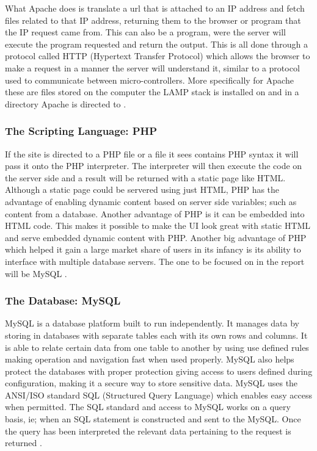 \documentclass[a4paper,11pt]{article}
\numberwithin{figure}{section}
\numberwithin{table}{section}
\begin{document}
What Apache does is translate a url that is attached to an IP address and fetch files related to that IP address, returning them to the browser or program that the IP request came from. This can also be a program, were the server will execute the program requested and return the output. This is all done through a protocol called HTTP (Hypertext Transfer Protocol) which allows the browser to make a request in a manner the server will understand it, similar to a protocol used to communicate between micro-controllers. More specifically for Apache these are files stored on the computer the LAMP stack is installed on and in a directory Apache is directed to \cite{apachebook1,apachebook2}.  


\subsubsection{The Scripting Language: PHP}
If the site is directed to a PHP file or a file it sees contains PHP syntax it will pass it onto the PHP interpreter. The interpreter will then execute the code on the server side and a result will be returned with a static page like HTML. Although a static page could be servered using just HTML, PHP has the advantage of enabling dynamic content based on server side variables; such as content from a database. Another advantage of PHP is it can be embedded into HTML code. This makes it possible to make the UI look great with static HTML and serve embedded dynamic content with PHP. Another big advantage of PHP which helped it gain a large market share of users in its infancy is its ability to interface with multiple database servers. The one to be focused on in the report will be MySQL \cite{PHP}.


\subsubsection{The Database: MySQL}
MySQL is a database platform built to run independently. It manages data by storing in databases with separate tables each with its own rows and columns. It is able to relate certain data from one table to another by using use defined rules making operation and navigation fast when used properly. MySQL also helps protect the databases with proper protection giving access to users defined during configuration, making it a secure way to store sensitive data. MySQL uses the ANSI/ISO standard SQL (Structured Query Language) which enables easy access when permitted. The SQL standard and access to MySQL works on a query basis, ie; when an SQL statement is constructed and sent to the MySQL. Once the query has been interpreted the relevant data pertaining to the request is returned \cite{mysql}.  
\end{document}
